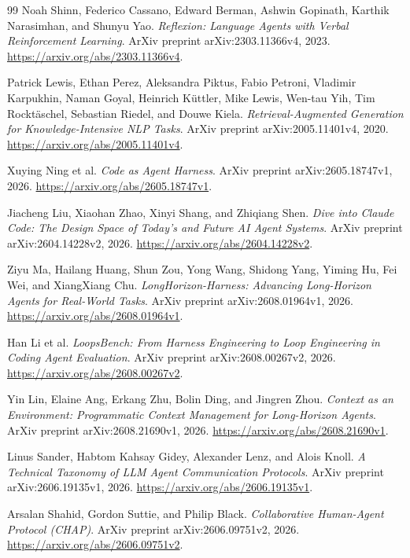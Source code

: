 \documentclass[11pt,a4paper]{article}
\begin{document}
\begin{thebibliography}{99}
Noah Shinn, Federico Cassano, Edward Berman, Ashwin Gopinath,
Karthik Narasimhan, and Shunyu Yao.
\emph{Reflexion: Language Agents with Verbal Reinforcement Learning}.
ArXiv preprint arXiv:2303.11366v4, 2023.
\url{https://arxiv.org/abs/2303.11366v4}.

Patrick Lewis, Ethan Perez, Aleksandra Piktus, Fabio Petroni,
Vladimir Karpukhin, Naman Goyal, Heinrich K{\"u}ttler, Mike Lewis,
Wen-tau Yih, Tim Rockt{\"a}schel, Sebastian Riedel, and Douwe Kiela.
\emph{Retrieval-Augmented Generation for Knowledge-Intensive NLP Tasks}.
ArXiv preprint arXiv:2005.11401v4, 2020.
\url{https://arxiv.org/abs/2005.11401v4}.

Xuying Ning et al.
\emph{Code as Agent Harness}.
ArXiv preprint arXiv:2605.18747v1, 2026.
\url{https://arxiv.org/abs/2605.18747v1}.

Jiacheng Liu, Xiaohan Zhao, Xinyi Shang, and Zhiqiang Shen.
\emph{Dive into Claude Code: The Design Space of Today's and Future AI Agent
Systems}.
ArXiv preprint arXiv:2604.14228v2, 2026.
\url{https://arxiv.org/abs/2604.14228v2}.

Ziyu Ma, Hailang Huang, Shun Zou, Yong Wang, Shidong Yang, Yiming Hu, Fei Wei,
and XiangXiang Chu.
\emph{LongHorizon-Harness: Advancing Long-Horizon Agents for Real-World Tasks}.
ArXiv preprint arXiv:2608.01964v1, 2026.
\url{https://arxiv.org/abs/2608.01964v1}.

Han Li et al.
\emph{LoopsBench: From Harness Engineering to Loop Engineering in Coding Agent
Evaluation}.
ArXiv preprint arXiv:2608.00267v2, 2026.
\url{https://arxiv.org/abs/2608.00267v2}.

Yin Lin, Elaine Ang, Erkang Zhu, Bolin Ding, and Jingren Zhou.
\emph{Context as an Environment: Programmatic Context Management for
Long-Horizon Agents}.
ArXiv preprint arXiv:2608.21690v1, 2026.
\url{https://arxiv.org/abs/2608.21690v1}.

Linus Sander, Habtom Kahsay Gidey, Alexander Lenz, and Alois Knoll.
\emph{A Technical Taxonomy of LLM Agent Communication Protocols}.
ArXiv preprint arXiv:2606.19135v1, 2026.
\url{https://arxiv.org/abs/2606.19135v1}.

Arsalan Shahid, Gordon Suttie, and Philip Black.
\emph{Collaborative Human-Agent Protocol (CHAP)}.
ArXiv preprint arXiv:2606.09751v2, 2026.
\url{https://arxiv.org/abs/2606.09751v2}.


\end{thebibliography}
\end{document}
